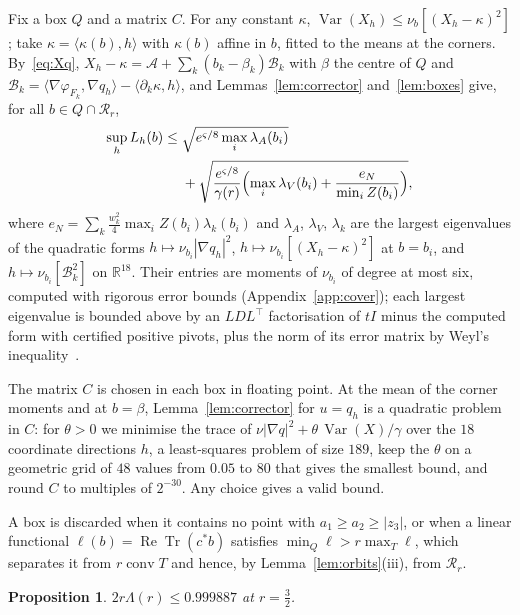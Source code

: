 \documentclass[11pt]{amsart}
\newtheorem{proposition}[theorem]{Proposition}
\theoremstyle{definition}
\theoremstyle{remark}
\numberwithin{equation}{section}
\newcommand{\R}{\mathbb{R}}
\newcommand{\ReTr}{\operatorname{Re}\operatorname{Tr}}
\newcommand{\Var}{\operatorname{Var}}
\newcommand{\ip}[2]{\langle #1,#2\rangle}
\begin{document}
Fix a box $Q$ and a matrix $C$. For any constant $\kappa$, $\Var(X_h)\le
\nu_b[(X_h-\kappa)^2]$; take $\kappa=\ip{\kappa(b)}h$ with $\kappa(b)$ affine in
$b$, fitted to the means at the corners. By~\eqref{eq:Xq}, $X_h-\kappa=
\mathcal A+\sum_k(b_k-\beta_k)\mathcal B_k$ with $\beta$ the centre of $Q$ and
$\mathcal B_k=\ip{\nabla\varphi_{F_k}}{\nabla q_h}-\ip{\partial_k\kappa}h$, and
Lemmas~\ref{lem:corrector} and~\ref{lem:boxes} give, for all $b\in Q\cap
\mathcal R_r$,
\begin{equation}\label{eq:BQ}
\begin{split}
\sup_hL_h(b)\le{}&\sqrt{e^{\varsigma/8}\max_i\lambda_A(b_i)}\\
&+\sqrt{\frac{e^{\varsigma/8}}{\gamma(r)}\Bigl(\max_i\lambda_V(b_i)+
\frac{e_N}{\min_iZ(b_i)}\Bigr)} ,
\end{split}
\end{equation}
where $e_N=\sum_k\frac{w_k^2}4\max_iZ(b_i)\lambda_k(b_i)$ and $\lambda_A$,
$\lambda_V$, $\lambda_k$ are the largest eigenvalues of the quadratic forms
$h\mapsto\nu_{b_i}|\nabla q_h|^2$, $h\mapsto\nu_{b_i}[(X_h-\kappa)^2]$ at $b=b_i$,
and $h\mapsto\nu_{b_i}[\mathcal B_k^2]$ on $\R^{18}$. Their entries are moments
of $\nu_{b_i}$ of degree at most six, computed with rigorous error bounds
(Appendix~\ref{app:cover}); each largest eigenvalue is bounded above by an
$LDL^\top$ factorisation of $tI$ minus the computed form with certified
positive pivots, plus the norm of its error matrix by Weyl's
inequality~\cite{Hig02,Joh17}.

The matrix $C$ is chosen in each box in floating point. At the mean of the
corner moments and at $b=\beta$, Lemma~\ref{lem:corrector} for $u=q_h$ is a
quadratic problem in $C$: for $\theta>0$ we minimise the trace of
$\nu|\nabla q|^2+\theta\,\Var(X)/\gamma$ over the $18$ coordinate directions
$h$, a least-squares problem of size $189$, keep the $\theta$ on a geometric grid of
$48$ values from $0.05$ to $80$ that gives the smallest bound, and round $C$ to multiples of
$2^{-30}$. Any choice gives a valid bound.

A box is discarded when it contains no point with $a_1\ge a_2\ge|z_3|$, or
when a linear functional $\ell(b)=\ReTr(c^*b)$ satisfies $\min_Q\ell>r\max_T
\ell$, which separates it from $r\operatorname{conv}T$ and hence, by
Lemma~\ref{lem:orbits}(iii), from $\mathcal R_r$.

\begin{proposition}\label{prop:cover}
$2r\Lambda(r)\le0.999887$ at $r=\frac32$.
\end{proposition}
\end{document}
